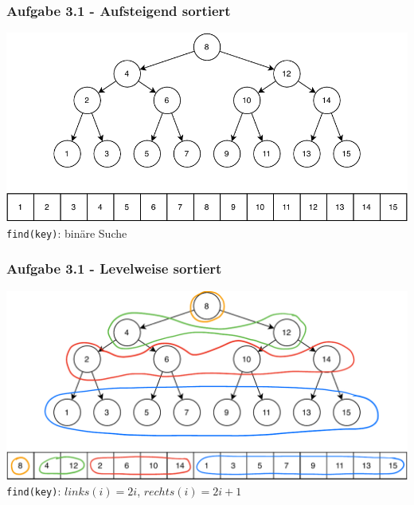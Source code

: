 \documentclass[aspectratio=169]{beamer}
\begin{document}
\begin{frame}
	\frametitle{Aufgabe 3.1 - Aufsteigend sortiert}
	
	
	\begin{center}
		\includegraphics[scale=.8]{sorted_layout.pdf}\\
		\centering \texttt{find(key)}: binäre Suche	
	\end{center}
	\end{frame}


\begin{frame}
	\frametitle{Aufgabe 3.1 - Levelweise sortiert}
	
	
	\begin{center}
		\includegraphics[scale=.6]{level_layout.pdf}\\
		\centering \texttt{find(key)}: $links(i) = 2i$, $rechts(i) = 2i+1$	
	\end{center}
	\end{frame}
\end{document}

